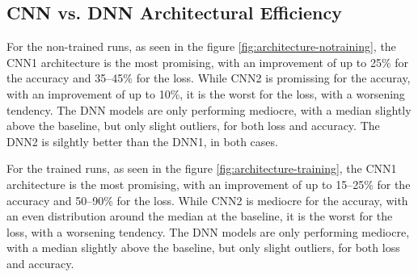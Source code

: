 \subsection{CNN vs. DNN Architectural Efficiency}\label{subsec:cnn-vs.-dnn-architectural-efficiency}
For the non-trained runs, as seen in the figure \ref{fig:architecture-notraining}, the CNN1 architecture is the most promising, with an improvement of up to 25\% for the accuracy and 35--45\% for the loss.
While CNN2 is promissing for the accuray, with an improvement of up to 10\%, it is the worst for the loss, with a worsening tendency.
The DNN models are only performing mediocre, with a median slightly above the baseline, but only slight outliers, for both loss and accuracy.
The DNN2 is silghtly better than the DNN1, in both cases.

For the trained runs, as seen in the figure \ref{fig:architecture-training}, the CNN1 architecture is the most promising, with an improvement of up to 15--25\% for the accuracy and 50--90\% for the loss.
While CNN2 is mediocre for the accuray, with an even distribution around the median at the baseline, it is the worst for the loss, with a worsening tendency.
The DNN models are only performing mediocre, with a median slightly above the baseline, but only slight outliers, for both loss and accuracy.

